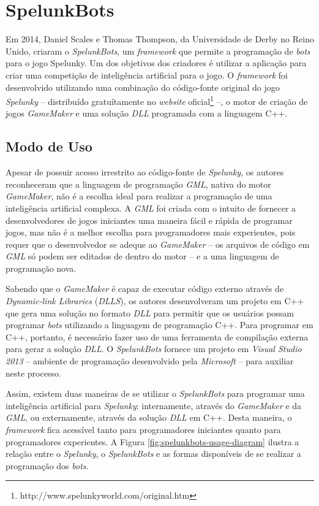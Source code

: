 \chapter{\label{chap:spelunkbots}SpelunkBots}
Em 2014, Daniel Scales e Thomas Thompson, da Universidade de Derby no Reino
Unido, criaram o \textit{SpelunkBots}\cite{SPELUNKBOTSPAPER}, um
\textit{framework} que permite a programação de \textit{bots} para o jogo
Spelunky. Um dos objetivos dos criadores é utilizar a aplicação para criar uma
competição de inteligência artificial para o jogo. O \textit{framework} foi
desenvolvido utilizando uma combinação do código-fonte original do jogo
\textit{Spelunky} -- distribuído gratuítamente no \textit{website}
oficial\footnote{http://www.spelunkyworld.com/original.htm} --, o motor de
criação de jogos \textit{GameMaker} e uma solução \textit{DLL} programada com a
linguagem C++.


\section{Modo de Uso}
Apesar de possuir acesso irrestrito ao código-fonte de \textit{Spelunky}, os
autores reconheceram que a linguagem de programação \textit{GML}, nativa do
motor \textit{GameMaker}, não é a escolha ideal para realizar a programação de
uma inteligência artificial complexa. A \textit{GML} foi criada com o intuito de
fornecer a desenvolvedores de jogos iniciantes uma maneira fácil e rápida de
programar jogos, mas não é a melhor escolha para programadores mais experientes,
pois requer que o desenvolvedor se adeque ao \textit{GameMaker} -- os arquivos
de código em \textit{GML} só podem ser editados de dentro do motor -- e a uma
linguagem de programação nova.

Sabendo que o \textit{GameMaker} é capaz de executar código externo através de
\textit{Dynamic-link Libraries} (\textit{DLLS}), os autores desenvolveram um
projeto em C++ que gera uma solução no formato \textit{DLL} para permitir que os
usuários possam programar \textit{bots} utilizando a linguagem de programação
C++. Para programar em C++, portanto,  é necessário fazer uso de uma ferramenta de
compilação externa para gerar a solução \textit{DLL}. O \textit{SpelunkBots}
fornece um projeto em \textit{Visual Studio 2013} -- ambiente de programação
desenvolvido pela \textit{Microsoft} -- para auxiliar neste processo.

Assim, existem duas maneiras de se utilizar o \textit{SpelunkBots} para
programar uma inteligência artificial para \textit{Spelunky}: internamente,
através do \textit{GameMaker} e da \textit{GML}, ou externamente, através da
solução \textit{DLL} em C++. Desta maneira, o \textit{framework} fica acessível
tanto para programadores iniciantes quanto para programadores experientes.  A
Figura \ref{fig:spelunkbots-usage-diagram} ilustra a relação entre o
\textit{Spelunky}, o \textit{SpelunkBots} e as formas disponíveis de se realizar
a programação dos \textit{bots}.

